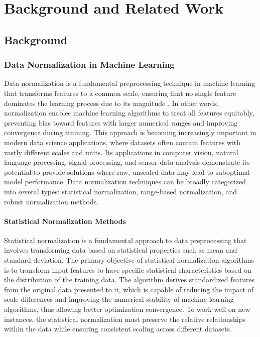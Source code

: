 \chapter{Background and Related Work}

\section{Background}

\subsection{Data Normalization in Machine Learning}
Data normalization is a fundamental preprocessing technique in machine learning that transforms features to a common scale, ensuring that no single feature dominates the learning process due to
its magnitude \cite{normalization_ref}. In other words, normalization enables machine learning algorithms to treat all features equitably, preventing bias toward features with larger numerical
ranges and improving convergence during training. This approach is becoming increasingly important in modern data science applications, where datasets often contain features with vastly different
scales and units. Its applications in computer vision, natural language processing, signal processing, and sensor data analysis demonstrate its potential to provide solutions where raw, unscaled
data may lead to suboptimal model performance. Data normalization techniques can be broadly categorized into several types: statistical normalization, range-based normalization, and robust
normalization methods.

\subsubsection{Statistical Normalization Methods}

Statistical normalization is a fundamental approach to data preprocessing that involves transforming data based on statistical properties such as mean and standard deviation. The primary objective
of statistical normalization algorithms is to transform input features to have specific statistical characteristics based on the distribution of the training data. The algorithm derives
standardized features from the original data presented to it, which is capable of reducing the impact of scale differences and improving the numerical stability of machine learning algorithms,
thus allowing better optimization convergence. To work well on new instances, the statistical normalization must preserve the relative relationships within the data while ensuring consistent
scaling across different datasets.


